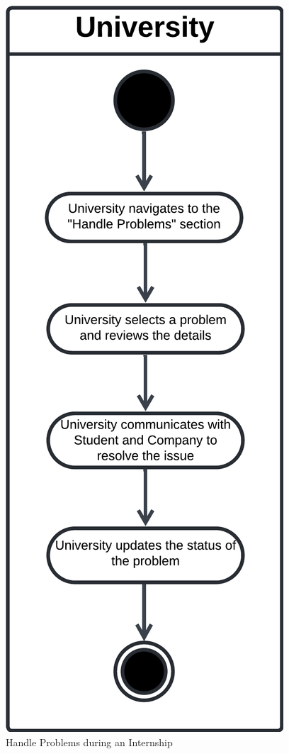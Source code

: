 \begin{figure}[H]
    \begin{center}
         \includegraphics[width=0.65\linewidth]{LaTeXCode/images/activity diagram/UC17.png}
         \caption{Handle Problems during an Internship}
         \label{fig:handle_problems_ad}
     \end{center}
\end{figure}

\newpage


